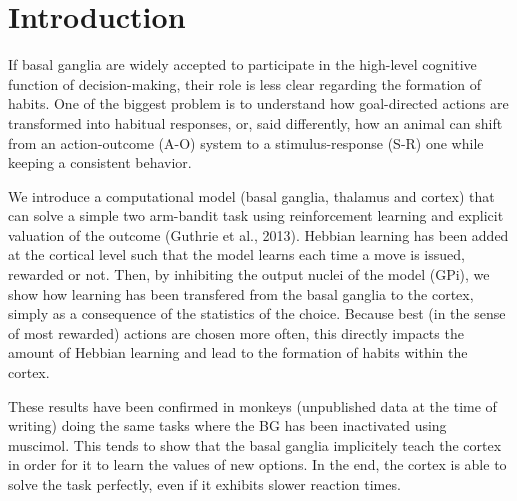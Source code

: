 \section{Introduction}


If basal ganglia are widely accepted to participate in the high-level cognitive function of decision-making, their role is less clear regarding the formation of habits. One of the biggest problem is to understand how goal-directed actions are transformed into habitual responses, or, said differently, how an animal can shift from an action-outcome (A-O) system to a stimulus-response (S-R) one while keeping a consistent behavior.

We introduce a computational model (basal ganglia, thalamus and cortex) that can solve a simple two arm-bandit task using reinforcement learning and explicit valuation of the outcome (Guthrie et al., 2013). Hebbian learning has been added at the cortical level such that the model learns each time a move is issued, rewarded or not. Then, by inhibiting the output nuclei of the model (GPi), we show how learning has been transfered from the basal ganglia to the cortex, simply as a consequence of the statistics of the choice. Because best (in the sense of most rewarded) actions are chosen more often, this directly impacts the amount of Hebbian learning and lead to the formation of habits within the cortex.

These results have been confirmed in monkeys (unpublished data at the time of writing) doing the same tasks where the BG has been inactivated using muscimol. This tends to show that the basal ganglia implicitely teach the cortex in order for it to learn the values of new options. In the end, the cortex is able to solve the task perfectly, even if it exhibits slower reaction times.

